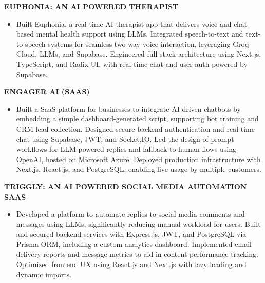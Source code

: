 \documentclass[letterpaper,10pt]{article}
\newcommand{\runsubsection}[1]{
  \color{subheadings}\fontsize{11pt}{13pt}\selectfont\bfseries\uppercase{#1}\normalfont
}
\newcommand{\descript}[1]{
  \color{subheadings}\raggedright\scshape\fontsize{10pt}{12pt}\selectfont{#1\\}\normalfont
}
\newenvironment{tightitemize}{
  \vspace{2pt}\begin{itemize}[leftmargin=12pt]\itemsep1pt \parskip0pt \parsep0pt
}{
  \end{itemize}\vspace{-\topsep}
}
\newcommand{\sectionsep}{\vspace{6pt}}
\begin{document}
\begin{minipage}[t]{0.66\textwidth}
\runsubsection{Euphonia: An AI Powered Therapist}

\descript{| Next.js, Supabase, LLM, AI, AWS, Groq Cloud, Radix UI, TypeScript, MS Azure}


\begin{tightitemize}
\item Built Euphonia, a real-time AI therapist app that delivers voice and chat-based mental health support using LLMs. Integrated speech-to-text and text-to-speech systems for seamless two-way voice interaction, leveraging Groq Cloud, LLMs, and Supabase. Engineered full-stack architecture using Next.js, TypeScript, and Radix UI, with real-time chat and user auth powered by Supabase.
\end{tightitemize}
\sectionsep

\runsubsection{Engager AI (SaaS)}

\descript{| React, Next.js, TypeScript, JavaScript, LLM, AI (OpenAI), Microsoft Azure, Socket.IO}


\begin{tightitemize}
\item Built a SaaS platform for businesses to integrate AI-driven chatbots by embedding a simple dashboard-generated script, supporting bot training and CRM lead collection. Designed secure backend authentication and real-time chat using Supabase, JWT, and Socket.IO. Led the design of prompt workflows for LLM-powered replies and fallback-to-human flows using OpenAI, hosted on Microsoft Azure. Deployed production infrastructure with Next.js, React.js, and PostgreSQL, enabling live usage by multiple customers.
\end{tightitemize}
\sectionsep

\runsubsection{Triggly: An AI Powered Social Media Automation SaaS}

\descript{| Next.js, PostgreSQL, Prisma, TypeScript, Node.js, Express.js}


\begin{tightitemize}
\item Developed a platform to automate replies to social media comments and messages using LLMs, significantly reducing manual workload for users. Built and secured backend services with Express.js, JWT, and PostgreSQL via Prisma ORM, including a custom analytics dashboard. Implemented email delivery reports and message metrics to aid in content performance tracking. Optimized frontend UX using React.js and Next.js with lazy loading and dynamic imports.
\end{tightitemize}
\sectionsep


\end{minipage}
\end{document}
